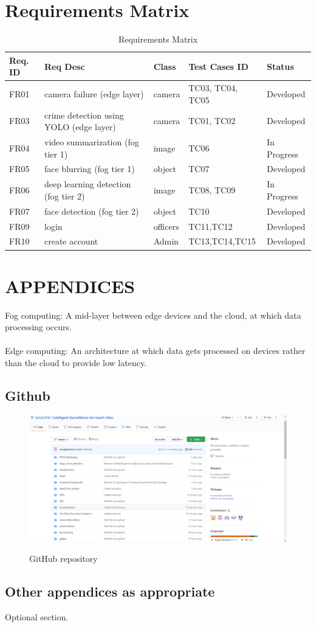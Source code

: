\documentclass[12pt]{article}
\begin{document}
\section{Requirements Matrix}
\begin{table}[htbp]
\centering
\caption{Requirements Matrix}
\label{tab:RM}
\begin{tabular}{|l|l|l|l|l|}
\hline
Req. ID  & Req Desc & Class & Test Cases ID & Status      \\ \hline
FR01     & camera failure (edge layer)     & camera & TC03, TC04, TC05    & Developed \\ \hline
FR03     & crime detection using YOLO (edge layer)     & camera & TC01, TC02    & Developed \\ \hline
FR04     & video summarization (fog tier 1)     & image & TC06   & In Progress   \\ \hline
FR05     & face blurring (fog tier 1)     & object & TC07   & Developed   \\ \hline
FR06     & deep learning detection (fog tier 2)     & image & TC08, TC09   & In Progress   \\ \hline
FR07     & face detection (fog tier 2)     & object & TC10   & Developed   \\ \hline
FR09     & login     & officers & TC11,TC12   & Developed   \\ \hline
FR10     & create account     & Admin & TC13,TC14,TC15   & Developed   \\ \hline
\end{tabular}
\end{table}


\section{APPENDICES}
Fog computing: A mid-layer between edge devices and the cloud, at which data processing occurs. 
\\
\\
Edge computing: An architecture at which data gets processed on devices rather than the cloud to provide low latency.
\newpage
\subsection{Github}
\begin{figure}[h]
  \centering
  \includegraphics[width=18cm]{Screenshot (403).png}
  \label{fig:2}
   \caption{GitHub repository}
\end{figure}

\subsection{ Other appendices as appropriate}
Optional section.

\printbibliography
\end{document}
